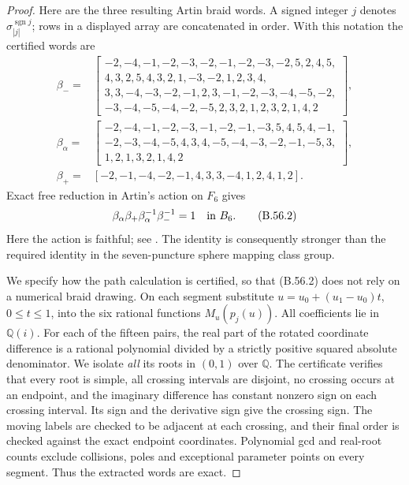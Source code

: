 \begin{proof}
Here are the three resulting Artin braid words.
A signed integer $j$ denotes $\sigma_{|j|}^{\operatorname{sgn}j}$;
rows in a displayed array are concatenated in order.
With this notation the certified words are
\[
\begin{split}
 \beta_-={}&\left[\begin{array}{l}
 -2,-4,-1,-2,-3,-2,-1,-2,-3,-2,5,2,4,5,\\
 4,3,2,5,4,3,2,1,-3,-2,1,2,3,4,\\
 3,3,-4,-3,-2,-1,2,3,-1,-2,-3,-4,-5,-2,\\
 -3,-4,-5,-4,-2,-5,2,3,2,1,2,3,2,1,4,2
 \end{array}\right],\\[1mm]
 \beta_\alpha={}&\left[\begin{array}{l}
 -2,-4,-1,-2,-3,-1,-2,-1,-3,5,4,5,4,-1,\\
 -2,-3,-4,-5,4,3,4,-5,-4,-3,-2,-1,-5,3,\\
 1,2,1,3,2,1,4,2
 \end{array}\right],\\[1mm]
 \beta_+={}&[-2,-1,-4,-2,-1,4,3,3,-4,1,2,4,1,2].
\end{split}
\]
Exact free reduction in Artin's action on $F_6$ gives
\[
 \beta_\alpha\beta_+\beta_\alpha^{-1}\beta_-^{-1}=1
                 \quad\hbox{in }B_6.
 \tag{B.56.2}
\]
Here the action is faithful; see
\citet[Sections 1.6 and 1.6.1]{DE_GonzalezMeneses2011}.
The identity is consequently stronger than the required
identity in the seven-puncture sphere mapping class group.

We specify how the path calculation is certified, so that
(B.56.2) does not rely on a numerical braid drawing.
On each segment substitute $u=u_0+(u_1-u_0)t$, $0\le t\le1$,
into the six rational functions $M_u(p_j(u))$.
All coefficients lie in $\mathbb Q(i)$.
For each of the fifteen pairs, the real part of the rotated
coordinate difference is a rational polynomial divided by
a strictly positive squared absolute denominator.
We isolate \emph{all} its roots in $(0,1)$ over $\mathbb Q$.
The certificate verifies that every root is simple, all
crossing intervals are disjoint, no crossing occurs at an
endpoint, and the imaginary difference has constant nonzero
sign on each crossing interval.
Its sign and the derivative sign give the crossing sign.
The moving labels are checked to be adjacent at each crossing,
and their final order is checked against the exact endpoint
coordinates.  Polynomial gcd and real-root counts exclude
collisions, poles and exceptional parameter points on every
segment.
Thus the extracted words are exact.


\end{proof}
